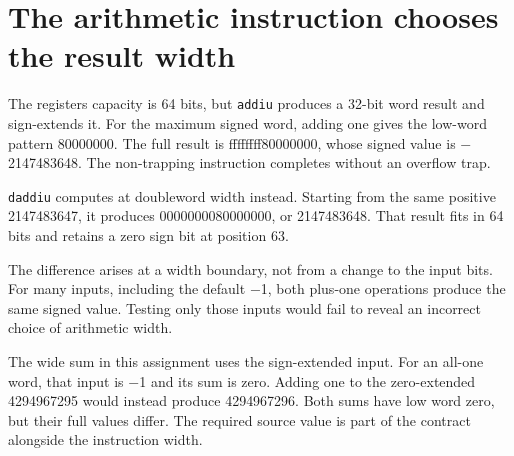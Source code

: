 \section{The arithmetic instruction chooses the result
  width}\label{004-bit-inspector-p05-the-arithmetic-instruction-chooses-the-result-width}

The register\textquotesingle s capacity is 64 bits, but \texttt{addiu}
produces a 32-bit word result and sign-extends it. For the maximum
signed word, adding one gives the low-word pattern 80000000. The full
result is ffffffff80000000, whose signed value is \ensuremath{-}2147483648. The
non-trapping instruction completes without an overflow trap.

\texttt{daddiu} computes at doubleword width instead. Starting from the
same positive 2147483647, it produces 0000000080000000, or 2147483648.
That result fits in 64 bits and retains a zero sign bit at position 63.

The difference arises at a width boundary, not from a change to the
input bits. For many inputs, including the default \ensuremath{-}1, both plus-one
operations produce the same signed value. Testing only those inputs
would fail to reveal an incorrect choice of arithmetic width.

The wide sum in this assignment uses the sign-extended input. For an
all-one word, that input is \ensuremath{-}1 and its sum is zero. Adding one to the
zero-extended 4294967295 would instead produce 4294967296. Both sums
have low word zero, but their full values differ. The required source
value is part of the contract alongside the instruction width.
